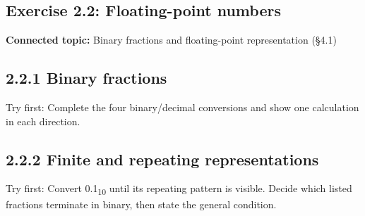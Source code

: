 \documentclass[11pt]{article}
\begin{document}
\begin{keepsection}
\section{Exercise 2.2: Floating-point numbers}

\textbf{Connected topic:} Binary fractions and floating-point representation (§4.1)

\begin{keepsection}
\subsection{2.2.1 Binary fractions}

Try first: Complete the four binary/decimal conversions and show one calculation in each direction.

\end{keepsection}

\begin{keepsection}
\subsection{2.2.2 Finite and repeating representations}

Try first: Convert 0.1\textsubscript{10} until its repeating pattern is visible. Decide which listed fractions terminate in binary, then state the general condition.

\end{keepsection}
\end{keepsection}
\end{document}
